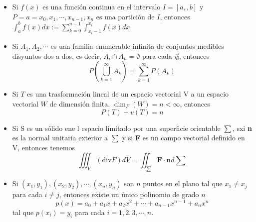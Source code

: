 \documentclass[12pt]{book}
\begin{document}
\begin{enumerate}
\begin{itemize}
                \item Si $f(x)$ es una función continua en el intervalo $I=[a,,b]$ y $P={a = x_{0},x_{1},\cdots,x_{n-1},x_{n}}$ es una 
                partición de $I$, entonces
                $\int_{a}^{b} f(x)dx := \sum_{k=0}^{n-1}\int_{x_{i}-1}^{x_{i}}f(x)dx$
                \item Si ${A_{1},A_{2},\cdots}$ es uan familia enumerable infinita de conjuntos medibles disyuntos dos a dos, es decir, $A_{i} \cap A_{n} = \emptyset$ para cada $i \not j$, entonces 
                \begin{equation*}
                    P(\bigcup_{k=1}^{\infty}A_{k})=\sum_{k=1}^{\infty}P(A_{k})
                \end{equation*}
                \item Si $T$ es una trasformación lineal de un espacio vectorial V a un espacio vectorial $W$ de dimensión finita, $\dim_{F}(W) = n < \infty$, entonces 
                \begin{equation*}
                    P(T)+v(T)=n
                \end{equation*}
                \item  Si S es un sólido ene l espacio limitado por una superficie orientable $\sum$, sxi \textbf{n} es la normal unitaria exterior a $\sum$ y si \textbf{F} es un campo vectorial definido en V, entonces tenemos
                \begin{equation*}
                    \iiint_{V}(\mathrm{div} F) dV = \iint_{\sum} \textbf{F} \cdot \textbf{n} d\sum
                \end{equation*}
                \item Si $(x_{1},y_{1}),(x_{2},y_{2}),\cdots,(x_{n},y_{n})$ son $n$ puntos en el plano tal que $x_{1} \not = x_{j}$ para cada $i \not = j$, entonces existe un único polinomio de grado $n$
                \begin{equation*}
                    p(x) = a_{0}+a_{1}x+a_{2}x^{2}+\cdots+a_{n-1}x^{n-1}+a_{n}x^{n}
                \end{equation*}
                tal que $p(x_{i})=y_{i}$ para cada $i=1,2,3,\cdots,n$.
            \end{itemize}
    \end{enumerate}
\end{document}
